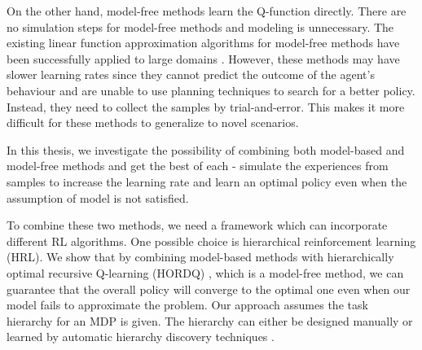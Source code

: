 On the other hand, model-free methods learn the Q-function directly. 
There are no simulation steps for model-free methods and modeling is unnecessary. 
The existing linear function approximation algorithms for model-free methods have been successfully 
applied to large domains \cite{LSTD99, KeepAway}. 
However, these methods may have slower learning rates since they cannot predict
the outcome of the agent's behaviour and are unable to use planning techniques to 
search for a better policy. Instead, they need to collect the samples by trial-and-error.
This makes it more difficult for these methods to generalize to novel scenarios.



In this thesis, we investigate the possibility of combining both model-based and model-free methods 
and get the best of each - simulate the experiences from samples to increase the learning rate
and learn an optimal policy even when the assumption of model is not satisfied. 


To combine these two methods, we need a framework which can incorporate different RL algorithms.
One possible choice is hierarchical reinforcement learning (HRL). 
We show that by combining model-based methods with 
hierarchically optimal recursive Q-learning (HORDQ) \cite{HORDQ}, which is a model-free method, we can 
guarantee that the overall policy will converge to the optimal one even when our model
fails to approximate the problem. 
Our approach assumes the task hierarchy for an MDP is given. The hierarchy can either be 
designed manually or learned by automatic hierarchy discovery techniques \cite{HexQ}.


